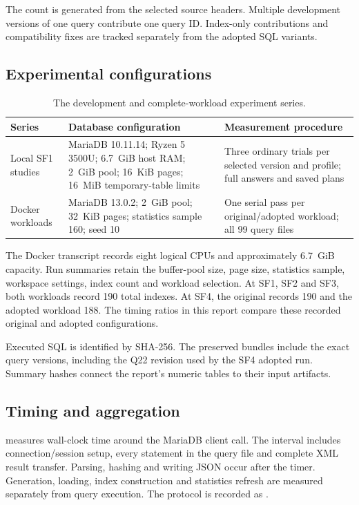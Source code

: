 \documentclass[11pt,a4paper]{article}
\DeclareRobustCommand{\file}[1]{\path{#1}}
\begin{document}
The count is generated from the selected source headers. Multiple development
versions of one query contribute one query ID. Index-only contributions and
compatibility fixes are tracked separately from the adopted SQL variants.

\subsection{Experimental configurations}
\begin{table}[htbp]\centering\footnotesize
\begin{tabularx}{\linewidth}{lYY}\toprule
Series & Database configuration & Measurement procedure \\ \midrule
Local SF1 studies & MariaDB 10.11.14; Ryzen 5 3500U; 6.7~GiB host RAM;
2~GiB pool; 16~KiB pages; 16~MiB temporary-table limits & Three ordinary trials
per selected version and profile; full answers and saved plans \\
Docker workloads & MariaDB 13.0.2; 2~GiB pool; 32~KiB pages; statistics sample
160; seed 10 & One serial pass per original/adopted workload; all 99 query files \\
\bottomrule\end{tabularx}
\caption{The development and complete-workload experiment series.}
\label{tab:environments}
\end{table}

The Docker transcript records eight logical CPUs and approximately 6.7~GiB
capacity. Run summaries retain the buffer-pool size, page size, statistics
sample, workspace settings, index count and workload selection. At SF1, SF2
and SF3, both workloads record 190 total indexes. At SF4, the original records 190 and the
adopted workload 188. The timing ratios in this report compare these recorded
original and adopted configurations.

Executed SQL is identified by SHA-256. The preserved bundles include the exact
query versions, including the Q22 revision used by the SF4 adopted run.
Summary hashes connect the report's numeric tables to their input artifacts.


\subsection{Timing and aggregation}
\file{docker/bench.py} measures wall-clock time around the MariaDB client call.
The interval includes connection/session setup, every statement in the query
file and complete XML result transfer. Parsing, hashing and writing JSON occur
after the timer. Generation, loading, index construction and statistics refresh
are measured separately from query execution. The protocol is recorded as
\file{whole-file-xml-v1}.
\end{document}
